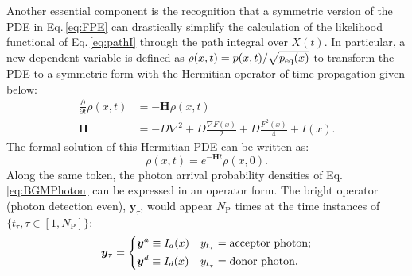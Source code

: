 \documentclass[journal=jpcbfk,manuscript=article,layout=twocolumn,articletitle=true]{achemso}
\begin{document}
Another essential component is the recognition that a symmetric version of the PDE in Eq.\,\ref{eq:FPE} can drastically simplify the calculation of the likelihood functional of Eq.\,\ref{eq:pathI} through the path integral over $X(t)$. In particular, a new dependent variable is defined as $\rho(x,t)=p(x,t)/\sqrt{p_{\rm{eq}}(x)}$ to transform the PDE to a symmetric form with the Hermitian operator of time propagation given below:
\begin{align}
\label{eq:Hoperator}
\frac{\partial}{\partial t} \rho(x,t) &= -\bm{H}\rho(x,t) \\
\label{eq:Hamiltonian}
\bm{H} &= - D\nabla^2  + D\frac{\nabla{F(x)}}{2} +D\frac{{F}^2(x)}{4} + I(x).
\end{align}  
The formal solution of this Hermitian PDE can be written as:
\begin{equation}
\label{eq:expH}
\rho(x,t)=e^{-\bm{H}t}\rho(x,0).
\end{equation}
Along the same token, the photon arrival probability densities of Eq.\,\ref{eq:BGMPhoton} can be expressed in an operator form. The bright operator (photon detection even), $\bm{y}_{\tau}$, would appear $N_{\mathrm{P}}$ times at the time instances of $\{ t_{\tau}, \tau \in [1,N_{\mathrm{P}}] \}$:
\begin{align}
\bm{y}_{\tau} = 
\begin{dcases}
\bm{y}^a \equiv I_a(x) & y_{t_\tau} =\text{acceptor photon};\\ 
\bm{y}^d \equiv I_d(x) & y_{t_\tau}=\text{donor photon}.
\end{dcases}
\end{align}
\end{document}
